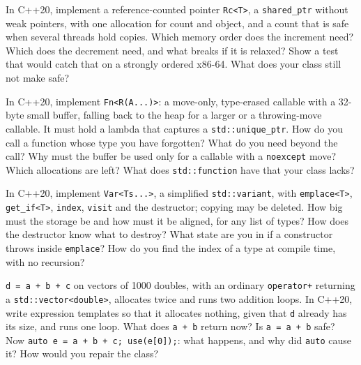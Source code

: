 \begin{question}\label{iq:iv3:cpp:57}
In C++20, implement a reference-counted pointer \texttt{Rc<T>}, a \texttt{shared\_ptr} without weak pointers, with one allocation for count and object, and a count that is safe when several threads hold copies. Which memory order does the increment need? Which does the decrement need, and what breaks if it is relaxed? Show a test that would catch that on a strongly ordered x86-64. What does your class still not make safe?
\end{question}

\begin{question}\label{iq:iv3:cpp:58}
In C++20, implement \texttt{Fn<R(A.{}.{}.)>}: a move-only, type-erased callable with a 32-byte small buffer, falling back to the heap for a larger or a throwing-move callable. It must hold a lambda that captures a \texttt{std::unique\_ptr}. How do you call a function whose type you have forgotten? What do you need beyond the call? Why must the buffer be used only for a callable with a \texttt{noexcept} move? Which allocations are left? What does \texttt{std::function} have that your class lacks?
\end{question}

\begin{question}\label{iq:iv3:cpp:59}
In C++20, implement \texttt{Var<Ts.{}.{}.>}, a simplified \texttt{std::variant}, with \texttt{emplace<T>}, \texttt{get\_if<T>}, \texttt{index}, \texttt{visit} and the destructor; copying may be deleted. How big must the storage be and how must it be aligned, for any list of types? How does the destructor know what to destroy? What state are you in if a constructor throws inside \texttt{emplace}? How do you find the index of a type at compile time, with no recursion?
\end{question}

\begin{question}\label{iq:iv3:cpp:60}
\texttt{d = a + b + c} on vectors of 1000 doubles, with an ordinary \texttt{operator+} returning a \texttt{std::vector<double>}, allocates twice and runs two addition loops. In C++20, write expression templates so that it allocates nothing, given that \texttt{d} already has its size, and runs one loop. What does \texttt{a + b} return now? Is \texttt{a = a + b} safe? Now \texttt{auto e = a + b + c; use(e[0]);}: what happens, and why did \texttt{auto} cause it? How would you repair the class?
\end{question}
